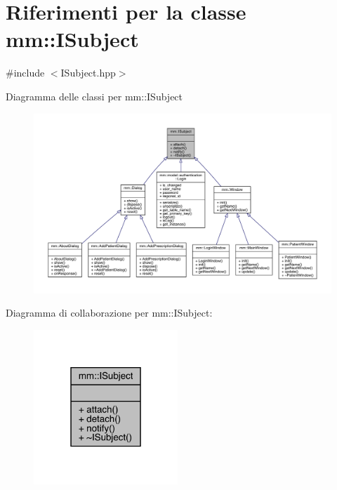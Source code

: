 \hypertarget{classmm_1_1_i_subject}{}\section{Riferimenti per la classe mm\+:\+:I\+Subject}
\label{classmm_1_1_i_subject}


{\ttfamily \#include $<$I\+Subject.\+hpp$>$}



Diagramma delle classi per mm\+:\+:I\+Subject\nopagebreak
\begin{figure}[H]
\begin{center}
\leavevmode
\includegraphics[width=350pt]{da/d21/classmm_1_1_i_subject__inherit__graph}
\end{center}
\end{figure}


Diagramma di collaborazione per mm\+:\+:I\+Subject\+:\nopagebreak
\begin{figure}[H]
\begin{center}
\leavevmode
\includegraphics[width=154pt]{d6/dd5/classmm_1_1_i_subject__coll__graph}
\end{center}
\end{figure}

